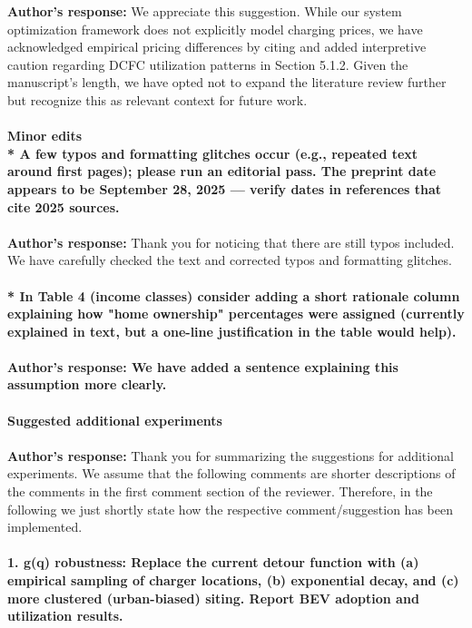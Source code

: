 \documentclass[11pt]{article}
\begin{document}
\color{authorblue}\noindent \textcolor{authorblue}{\textbf{Author's response:}} We appreciate this suggestion. While our system optimization framework does not explicitly model charging prices, we have acknowledged empirical pricing differences by citing \cite{Lanz2022} and added interpretive caution regarding DCFC utilization patterns in Section 5.1.2. Given the manuscript's length, we have opted not to expand the literature review further but recognize this as relevant context for future work. \\\\
\color{reviewergrey}
\textbf{Minor edits}\\
\textbf{* A few typos and formatting glitches occur (e.g., repeated text around first pages); please run an editorial pass. The preprint date appears to be September 28, 2025 — verify dates in references that cite 2025 sources. }\\\\
\color{authorblue}
\noindent \textcolor{authorblue}{\textbf{Author's response:}} Thank you for noticing that there are still typos included. We have carefully checked the text and corrected typos and formatting glitches. \\\\
\color{reviewergrey}\textbf{* In Table 4 (income classes) consider adding a short rationale column explaining how "home ownership" percentages were assigned (currently explained in text, but a one-line justification in the table would help).}\\\\ 
\color{authorblue}\textbf{\noindent \textcolor{authorblue}{\textbf{Author's response:}} We have added a sentence explaining this assumption more clearly. \\\\
\color{reviewergrey}
\textbf{Suggested additional experiments}} \\\\
\noindent \textcolor{authorblue}{\textbf{Author's response:}} Thank you for summarizing the suggestions for additional experiments. We assume that the following comments are shorter descriptions of the comments in the first comment section of the reviewer. Therefore, in the following we just shortly state how the respective comment/suggestion has been implemented.\\\\
\color{reviewergrey}
\textbf{1. g(q) robustness: Replace the current detour function with (a) empirical sampling of charger locations, (b) exponential decay, and (c) more clustered (urban-biased) siting. Report BEV adoption and utilization results.} \\\\
\end{document}
